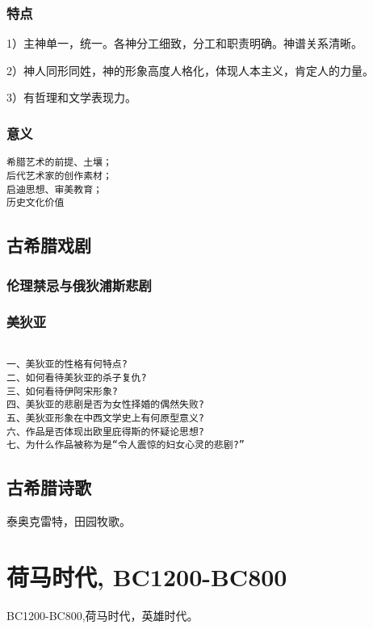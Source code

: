 \documentclass[UTF8]{../../RepresentationUniverse}
\begin{document}
\subsubsection{特点}
1）主神单一，统一。各神分工细致，分工和职责明确。神谱关系清晰。

2）神人同形同姓，神的形象高度人格化，体现人本主义，肯定人的力量。

3）有哲理和文学表现力。


\subsubsection{意义}

\begin{lstlisting}
希腊艺术的前提、土壤；
后代艺术家的创作素材；
启迪思想、审美教育；
历史文化价值
\end{lstlisting}


\subsection{古希腊戏剧}

\subsubsection{伦理禁忌与俄狄浦斯悲剧}

\subsubsection{美狄亚}

\begin{lstlisting}

一、美狄亚的性格有何特点?
二、如何看待美狄亚的杀子复仇?
三、如何看待伊阿宋形象?
四、美狄亚的悲剧是否为女性择婚的偶然失败?
五、美狄亚形象在中西文学史上有何原型意义?
六、作品是否体现出欧里庇得斯的怀疑论思想?
七、为什么作品被称为是“令人震惊的妇女心灵的悲剧?”

\end{lstlisting}


\subsection{古希腊诗歌}

泰奥克雷特，田园牧歌。


\section{荷马时代, BC1200-BC800}
BC1200-BC800,荷马时代，英雄时代。
\end{document}
